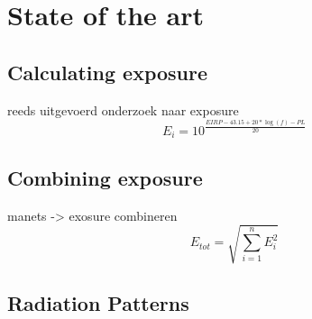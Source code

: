 \chapter{State of the art}
\label{sec:stateoftheart}
 
\section{Calculating exposure}
\label{sec:calculatingexposure}
reeds uitgevoerd onderzoek naar exposure
\begin{equation}
E_i = 10^{\frac{EIRP - 43.15 + 20*\log(f)- PL}{20}}
\end{equation}

\section{Combining exposure}
\label{sec:combiningexposure}
manets -> exosure combineren
\begin{equation}
E_{tot} = \sqrt{\sum_{i=1}^{n} E_i^2}
\end{equation}

\section{Radiation Patterns}
\label{sec:radiationpatterns}